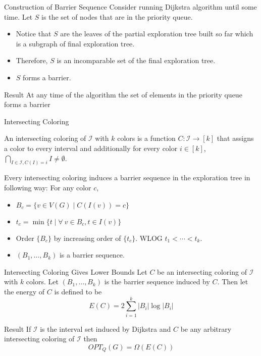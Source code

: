 \documentclass[10pt]{beamer}
\begin{document}
\begin{frame}{Construction of Barrier Sequence}
	Consider running Dijkstra algorithm until some time. Let $S$ is the set of nodes that are in the priority queue.\pause
	\begin{itemize}
		\item Notice that $S$ are the leaves of the partial exploration tree built so far which is a subgraph of final exploration tree.\pause
		\item Therefore, $S$ is an incomparable set of the final exploration tree.
		\item $S$ forms a barrier.
	\end{itemize}\pause \vfill

	\begin{alertblock}{Result}
		At any time of the algorithm the set of elements in the priority queue forms a barrier
	\end{alertblock}
\end{frame}
\begin{frame}{Intersecting Coloring}
	\begin{definition}
		An intersecting coloring of $\mathcal{I}$ with $k$ colors is a function $C:\mathcal{I}\to [k]$ that assigns a color to every interval and additionally for every color $i\in[k]$, $\bigcap\limits_{I\in\mathcal{I}, C(I)=i}I\neq \emptyset$.
	\end{definition}\pause \vfill

	Every intersecting coloring induces a barrier sequence in the exploration tree in following way: For any color $c$,\pause  \begin{itemize}
		\item  $B_c=\{v\in V(G)\mid C(I(v))=c\}$\pause
		\item $t_c=\min\{t\mid \forall\ v\in B_c, t\in I(v)\}$\pause
		\item Order $\{B_c\}$ by increasing order of $\{t_c\}$. WLOG $t_1<\cdots <t_k$.\pause
		\item $(B_1,\dots, B_k)$ is a barrier sequence.
	\end{itemize}
\end{frame}

\begin{frame}{Intersecting Coloring Gives Lower Bounds}
	Let $C$ be an intersecting coloring of $\mathcal{I}$ with $k$ colors.
	Let $(B_1,\dots, B_k)$ is the barrier sequence induced by $C$. Then let the energy of $C$ is defined to be $$E(C)=2\sum\limits_{i=1}^k|B_i|\log |B_i|$$\pause
	\vfill

	\begin{alertblock}{Result}
		If $\mathcal{I}$ is the interval set induced by Dijkstra and $C$ be any arbitrary intersecting coloring of $\mathcal{I}$ then $$OPT_Q(G)=\Omega(E(C))$$
	\end{alertblock}
\end{frame}
\end{document}

